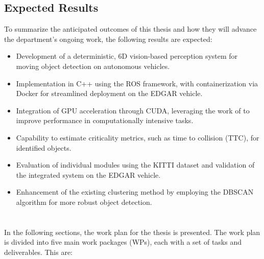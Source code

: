 \subsection{Expected Results}%

To summarize the anticipated outcomes of this thesis and how they will advance the department’s ongoing work, the following results are expected:

\begin{itemize} 
  \item Development of a deterministic, 6D vision-based perception system for moving object detection on autonomous vehicles. 
  \item Implementation in C++ using the ROS framework, with containerization via Docker for streamlined deployment on the EDGAR vehicle. 
  \item Integration of GPU acceleration through CUDA, leveraging the work of \cite{previous_tfm_pastor} to improve performance in computationally intensive tasks. 
  \item Capability to estimate criticality metrics, such as time to collision (TTC), for identified objects. 
  \item Evaluation of individual modules using the KITTI dataset and validation of the integrated system on the EDGAR vehicle. 
  \item Enhancement of the existing clustering method by employing the DBSCAN algorithm for more robust object detection. 
\end{itemize}

\section{}%



In the following sections, the work plan for the thesis is presented. The work plan is divided into five main
work packages (WPs), each with a set of tasks and deliverables. This are:

